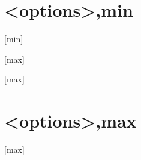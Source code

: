\documentclass[
    aspectratio=169
]{ctexbeamer}
\begin{document}
\part{<options>,min}
[min]
\makebottom

\subtitle{<options>,max}
\logo{\resizebox{!}{1cm}{\sjtubadge}}
\titlegraphic{\sjtubg[opacity=0.2]}
[max]
\maketitle
{}[max]
\part{<options>,max}
[max]
\makebottom
\end{document}
